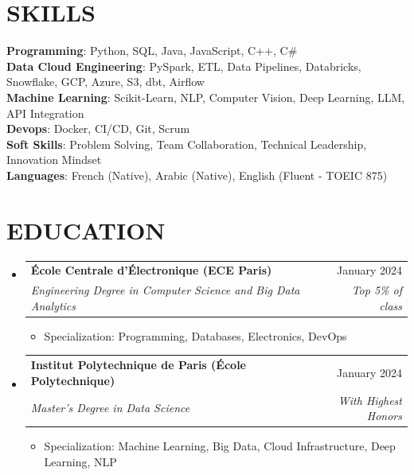 \documentclass[11pt,a4paper]{article}
\makeatletter
\newcommand{\resumeItem}[1]{
  \item\footnotesize{
    {#1 \vspace{-1pt}}
  }
}
\newcommand{\resumeSubheading}[4]{
  \vspace{2pt}\item
    \begin{tabular*}{\textwidth}[t]{l@{\extracolsep{\fill}}r}
      {\footnotesize\textbf{#1}} & {\footnotesize#2} \\
      {\footnotesize\textit{#3}} & {\footnotesize\textit{#4}} \\
    \end{tabular*}\vspace{2pt}
}
\newcommand{\resumeSubHeadingListStart}{\begin{itemize}[leftmargin=0in, label={}]}
\newcommand{\resumeSubHeadingListEnd}{\end{itemize}}
\newcommand{\resumeItemListStart}{\begin{itemize}[label={\textbullet}]}
\newcommand{\resumeItemListEnd}{\end{itemize}\vspace{0pt}}
\makeatother
\begin{document}
\section{SKILLS}
\begin{itemize}[leftmargin=0in, label={}]
\footnotesize{\item{
{\footnotesize\textbf{Programming}:} {\footnotesize Python, SQL, Java, JavaScript, C++, C{\#}} \\
\vspace{3pt}
{\footnotesize\textbf{Data Cloud Engineering}:} {\footnotesize PySpark, ETL, Data Pipelines, Databricks, Snowflake, GCP, Azure, S3, dbt, Airflow} \\
\vspace{3pt}
{\footnotesize\textbf{Machine Learning}:} {\footnotesize Scikit-Learn, NLP, Computer Vision, Deep Learning, LLM, API Integration} \\
\vspace{3pt}
{\footnotesize\textbf{Devops}:} {\footnotesize Docker, CI/CD, Git, Scrum} \\
\vspace{3pt}
{\footnotesize\textbf{Soft Skills}:} {\footnotesize Problem Solving, Team Collaboration, Technical Leadership, Innovation Mindset} \\
\vspace{3pt}
{\footnotesize\textbf{Languages}:} {\footnotesize French (Native), Arabic (Native), English (Fluent - TOEIC 875)}
}
}
\end{itemize}

\section{EDUCATION}
\resumeSubHeadingListStart
    \resumeSubheading
      {École Centrale d'Électronique (ECE Paris)}
      {January 2024}
      {Engineering Degree in Computer Science and Big Data Analytics}
      {Top 5\% of class}
      \resumeItemListStart
        \resumeItem{Specialization: Programming, Databases, Electronics, DevOps}
      \resumeItemListEnd
    \resumeSubheading
      {Institut Polytechnique de Paris (École Polytechnique)}
      {January 2024}
      {Master's Degree in Data Science}
      {With Highest Honors}
      \resumeItemListStart
        \resumeItem{Specialization: Machine Learning, Big Data, Cloud Infrastructure, Deep Learning, NLP}
      \resumeItemListEnd
  \resumeSubHeadingListEnd
\end{document}
